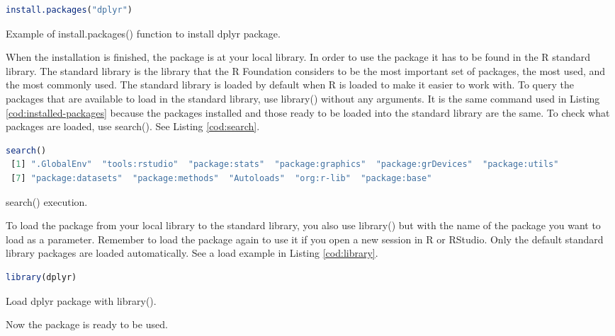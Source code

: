 \begin{codefloat}
\begin{lstlisting}[language=R, style=Ccolor]
install.packages("dplyr")
\end{lstlisting}
\caption{Example of install.packages() function to install dplyr package.}
\label{cod:install-packages-example}
\end{codefloat}

When the installation is finished, the package is at your local library. In order to use the package it has to be found in the R standard library. The standard library is the library that the R Foundation considers to be the most important set of packages, the most used, and the most commonly used. The standard library is loaded by default when R is loaded to make it easier to work with. To query the packages that are available to load in the standard library, use library() without any arguments. It is the same command used in Listing \ref{cod:installed-packages} because the packages installed and those ready to be loaded into the standard library are the same. To check what packages are loaded, use search(). See Listing \ref{cod:search}.

\begin{codefloat}
\begin{lstlisting}[language=R, style=Ccolor]
search()
 [1] ".GlobalEnv"  "tools:rstudio"  "package:stats"  "package:graphics"  "package:grDevices"  "package:utils"    
 [7] "package:datasets"  "package:methods"  "Autoloads"  "org:r-lib"  "package:base"  
\end{lstlisting}
\caption{search() execution.}
\label{cod:search}
\end{codefloat}

To load the package from your local library to the standard library, you also use library() but with the name of the package you want to load as a parameter. Remember to load the package again to use it if you open a new session in R or RStudio. Only the default standard library packages are loaded automatically. See a load example in Listing \ref{cod:library}.

\begin{codefloat}
\begin{lstlisting}[language=R, style=Ccolor]
library(dplyr)  
\end{lstlisting}
\caption{Load dplyr package with library().}
\label{cod:library}
\end{codefloat}

Now the package is ready to be used.

